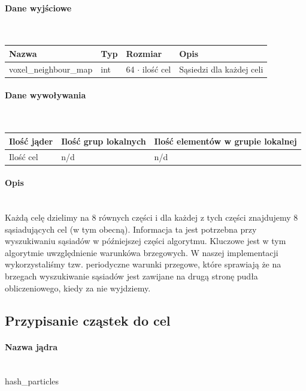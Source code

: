 \documentclass[polish, 12pt]{aghthesis}
\begin{document}
			\paragraph{Dane wyjściowe} \ \\
				\begin{tabular}{| p{} | p{} | p{} | p{} |}
				\hline
					Nazwa & Typ & Rozmiar & Opis \\
				\hline
					voxel\_neighbour\_map & int & 64 ${\cdot}$ ilość cel & Sąsiedzi dla każdej celi \\ 
				\hline
				\end{tabular}
			\paragraph{Dane wywoływania} \ \\
					\begin{tabular}{| p{} | p{} | p{}|}
					\hline
						Ilość jąder & Ilość grup lokalnych & Ilość elementów w grupie lokalnej \\
					\hline
						Ilość cel & n/d & n/d \\ 
					\hline
    				\end{tabular}
			\paragraph{Opis} \ \\
				\indent Każdą celę dzielimy na 8 równych części i dla każdej z tych części znajdujemy 8 sąsiadujących cel (w tym obecną). Informacja ta jest potrzebna przy wyszukiwaniu sąsiadów w późniejszej części algorytmu. Kluczowe jest w tym algorytmie uwzględnienie warunkówa brzegowych. W naszej implementacji wykorzystaliśmy tzw. periodyczne warunki przegowe, które sprawiają że na brzegach wyszukiwanie sąsiadów jest zawijane na drugą stronę pudła obliczeniowego, kiedy za nie wyjdziemy.
				
		\subsection{Przypisanie cząstek do cel}
			\paragraph{Nazwa jądra} \ \\
				hash\_particles
\end{document}
